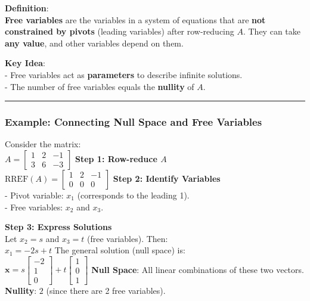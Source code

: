\documentclass[11pt]{article}
\begin{document}
\textbf{Definition}:\\
\textbf{Free variables} are the variables in a system of equations that
are \textbf{not constrained by pivots} (leading variables) after
row-reducing \(A\). They can take \textbf{any value}, and other
variables depend on them.

\textbf{Key Idea}:\\
- Free variables act as \textbf{parameters} to describe infinite
solutions.\\
- The number of free variables equals the \textbf{nullity} of \(A\).

\begin{center}\rule{0.5\linewidth}{0.5pt}\end{center}

\subsubsection{\texorpdfstring{\textbf{Example: Connecting Null Space
and Free
Variables}}{Example: Connecting Null Space and Free Variables}}\label{example-connecting-null-space-and-free-variables}

Consider the matrix:\\
\(A = \begin{bmatrix} 1 & 2 & -1 \\ 3 & 6 & -3 \end{bmatrix}\)
\textbf{Step 1: Row-reduce \(A\)}\\
\(\text{RREF}(A) = \begin{bmatrix} 1 & 2 & -1 \\ 0 & 0 & 0 \end{bmatrix}\)
\textbf{Step 2: Identify Variables}\\
- Pivot variable: \(x_1\) (corresponds to the leading 1).\\
- Free variables: \(x_2\) and \(x_3\).

\textbf{Step 3: Express Solutions}\\
Let \(x_2 = s\) and \(x_3 = t\) (free variables). Then:\\
\(x_1 = -2s + t\) The general solution (null space) is:\\
\(\mathbf{x} = s \begin{bmatrix} -2 \\ 1 \\ 0 \end{bmatrix} + t \begin{bmatrix} 1 \\ 0 \\ 1 \end{bmatrix}\)
\textbf{Null Space}: All linear combinations of these two vectors.\\
\textbf{Nullity}: \(2\) (since there are 2 free variables).
\end{document}
